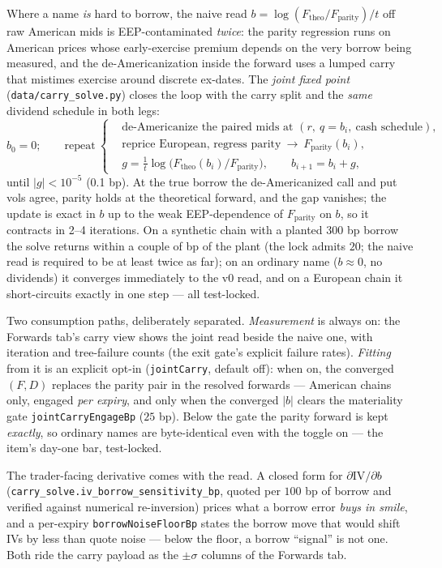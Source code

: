 \documentclass[11pt]{article}
\begin{document}
Where a name \emph{is} hard to borrow, the naive read
$b=\log(F_{\text{theo}}/F_{\text{parity}})/t$ off raw American mids is
EEP-contaminated \emph{twice}: the parity regression runs on American prices
whose early-exercise premium depends on the very borrow being measured, and
the de-Americanization inside the forward uses a lumped carry that mistimes
exercise around discrete ex-dates. The \emph{joint fixed point}
(\texttt{data/carry\_solve.py}) closes the loop with the carry split and the
\emph{same} dividend schedule in both legs:
\begin{equation}
b_0=0;\qquad
\text{repeat}\ \left\{
\begin{aligned}
&\text{de-Americanize the paired mids at }(r,\ q=b_i,\ \text{cash schedule}),\\
&\text{reprice European, regress parity}\ \to\ F_{\text{parity}}(b_i),\\
&g=\tfrac{1}{t}\log\!\big(F_{\text{theo}}(b_i)/F_{\text{parity}}\big),\qquad
b_{i+1}=b_i+g,
\end{aligned}\right.
\label{eq:carry_fixed_point}
\end{equation}
until $|g|<10^{-5}$ (0.1 bp). At the true borrow the de-Americanized call and
put vols agree, parity holds at the theoretical forward, and the gap
vanishes; the update is exact in $b$ up to the weak EEP-dependence of
$F_{\text{parity}}$ on $b$, so it contracts in 2--4 iterations. On a
synthetic chain with a planted $300$ bp borrow the solve returns within a
couple of bp of the plant (the lock admits $20$; the naive read is required
to be at least twice as far); on an ordinary name ($b\approx0$, no
dividends) it converges immediately to the v0 read, and on a European chain
it short-circuits exactly in one step --- all test-locked.

Two consumption paths, deliberately separated. \emph{Measurement} is always
on: the Forwards tab's carry view shows the joint read beside the naive one,
with iteration and tree-failure counts (the exit gate's explicit failure
rates). \emph{Fitting} from it is an explicit opt-in
(\texttt{jointCarry}, default off): when on, the converged $(F,D)$ replaces
the parity pair in the resolved forwards --- American chains only, engaged
\emph{per expiry}, and only when the converged $|b|$ clears the materiality
gate \texttt{jointCarryEngageBp} ($25$ bp). Below the gate the parity
forward is kept \emph{exactly}, so ordinary names are byte-identical even
with the toggle on --- the item's day-one bar, test-locked.

The trader-facing derivative comes with the read. A closed form for
$\partial\text{IV}/\partial b$
(\nolinkurl{carry_solve.iv_borrow_sensitivity_bp}, quoted per $100$ bp of
borrow and verified against numerical re-inversion) prices what a borrow
error \emph{buys in smile}, and a per-expiry
\texttt{borrowNoiseFloorBp} states the borrow move that would shift IVs by
less than quote noise --- below the floor, a borrow ``signal'' is not one.
Both ride the carry payload as the $\pm\sigma$ columns of the Forwards tab.
\end{document}

